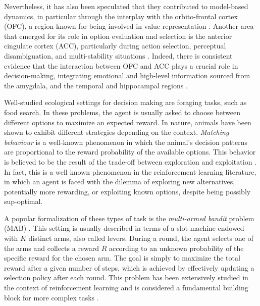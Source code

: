 Nevertheless, it has also been speculated that they contributed to model-based dynamics, in particular through the interplay with the orbito-frontal cortex (OFC), a region known for being involved in value representation \cite{frankAnatomyDecisionStriatoorbitofrontal2006, singhNucleusAccumbensCore2010, kennerleyDecisionMakingReward2011, mcdannaldModelbasedLearningContribution2012}.
Another area that emerged for its role in option evaluation and selection is the anterior cingulate cortex (ACC), particularly during action selection, perceptual disambiguation, and multi-stability situations \cite{waltonADAPTIVEDECISIONMAKING2007, safaviMultistabilityPerceptualValue2022}.
Indeed, there is consistent evidence that the interaction between OFC and ACC plays a crucial role in decision-making, integrating emotional and high-level information sourced from the amygdala, and the temporal and hippocampal regions \cite{rosenbloomFunctionalNeuroanatomyDecisionMaking2012, lukChoiceCodingFrontal2013, balewskiValueDynamicsAffect2023, rollsEmotionMotivationDecisionmaking2023}.


Well-studied ecological settings for decision making are foraging tasks, such as food search. In these problems, the agent is usually asked to choose between different options to maximize an expected reward.
In nature, animals have been shown to exhibit different strategies depending on the context.
\textit{Matching behaviour} is a well-known phenomenon in which the animal's decision patterns are proportional to the reward probability of the available options.
This behavior is believed to be the result of the trade-off between exploration and exploitation \cite{nivEvolutionReinforcementLearning2002}.
In fact, this is a well known phenomenon in the reinforcement learning literature, in which an agent is faced with the dilemma of exploring new alternatives, potentially more rewarding, or exploiting known options, despite being possibly sup-optimal.

A popular formalization of these types of task is the \textit{multi-armed bandit} problem (MAB) \cite{averbeckTheoryChoiceBandit2015}. This setting is usually described in terms of a slot machine endowed with $K$ distinct arms, also called levers.
During a round, the agent selects one of the arms and collects a reward $R$ according to an unknown probability of the specific reward for the chosen arm.
The goal is simply to maximize the total reward after a given number of steps, which is achieved by effectively updating a selection policy after each round.
This problem has been extensively studied in the context of reinforcement learning and is considered a fundamental building block for more complex tasks \cite{suttonReinforcementLearningProblem1998}.

